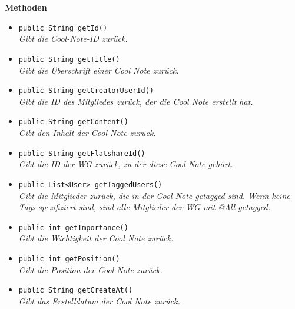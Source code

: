	\textbf{Methoden}
	\begin{itemize}
		\item\texttt{{public String getId()}}\\
		\textit{Gibt die Cool-Note-ID zurück.}\\
		
		\item\texttt{{public String getTitle()}}\\
		\textit{Gibt die Überschrift einer Cool Note zurück.}\\
		
		\item\texttt{{public String getCreatorUserId()}}\\
		\textit{Gibt die ID des Mitgliedes zurück, der die Cool Note erstellt hat.}\\
		
		\item\texttt{{public String getContent()}}\\
		\textit{Gibt den Inhalt der Cool Note zurück.}\\
		
		\item\texttt{{public String getFlatshareId()}}\\
		\textit{Gibt die ID der WG zurück, zu der diese Cool Note gehört.}\\
		
		\item\texttt{{public List<User> getTaggedUsers()}}\\
		\textit{Gibt die Mitglieder zurück, die in der Cool Note getagged sind. Wenn keine Tags spezifiziert sind, sind alle Mitglieder der WG mit @All getagged.}\\
		
		\item\texttt{public int getImportance()}\\
		\textit{Gibt die Wichtigkeit der Cool Note zurück.}\\
		
		\item\texttt{{public int getPosition()}}\\
		\textit{Gibt die Position der Cool Note zurück.}\\
		
		\item\texttt{{public String getCreateAt()}}\\
		\textit{Gibt das Erstelldatum der Cool Note zurück.}\\
	\end{itemize}

